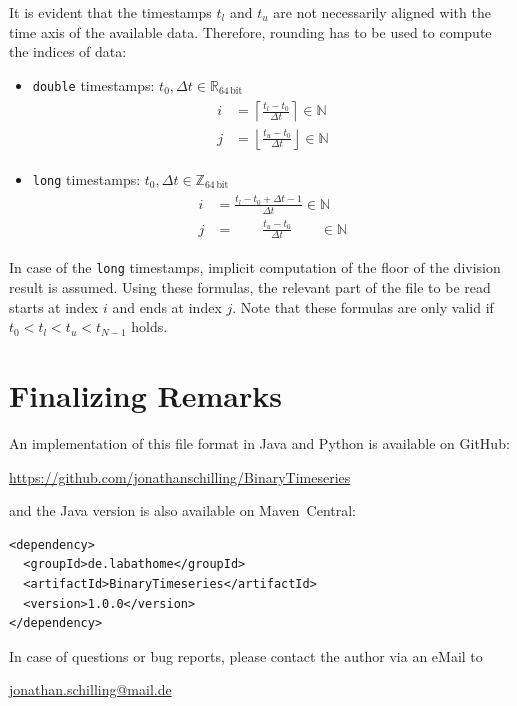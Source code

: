 \documentclass[a4paper,10pt]{article}
\begin{document}
It is evident that the timestamps $t_l$ and $t_u$ are not necessarily aligned with the time axis of the available data.
Therefore, rounding has to be used to compute the indices of data:
\begin{itemize}
  \item \texttt{double} timestamps: $t_0, \Delta t \in \mathbb{R}_\mathrm{64\,bit}$
  \begin{gather}
   \begin{aligned}
    i & = \left\lceil  \frac{t_l - t_0}{\Delta t} \right\rceil  \in \mathbb{N} \\
    j & = \left\lfloor \frac{t_u - t_0}{\Delta t} \right\rfloor \in \mathbb{N}
   \end{aligned}
  \end{gather}
  \item \texttt{long} timestamps: $t_0, \Delta t \in \mathbb{Z}_\mathrm{64\,bit}$
  \begin{gather}
   \begin{aligned}
    i & = \frac{t_l - t_0 + \Delta t - 1}{\Delta t} \in \mathbb{N} \\
    j & = \qquad \frac{t_u - t_0}{\Delta t} \qquad  \in \mathbb{N}
   \end{aligned}
  \end{gather}
\end{itemize}
In case of the \texttt{long} timestamps, implicit computation of the floor of the division result is assumed.
Using these formulas, the relevant part of the file to be read starts at index $i$ and ends at index $j$.
Note that these formulas are only valid if $t_0 < t_l < t_u < t_{N-1}$ holds.








\section{Finalizing Remarks}
An implementation of this file format in Java and Python is available on GitHub:
\begin{center}
\href{https://github.com/jonathanschilling/BinaryTimeseries}{https://github.com/jonathanschilling/BinaryTimeseries}
\end{center}
and the Java version is also available on Maven~Central:
\begin{verbatim}
<dependency>
  <groupId>de.labathome</groupId>
  <artifactId>BinaryTimeseries</artifactId>
  <version>1.0.0</version>
</dependency>
\end{verbatim}
In case of questions or bug reports, please contact the author via an eMail to
\begin{center}
\href{mailto:jonathan.schilling@mail.de}{jonathan.schilling@mail.de}
\end{center}
\end{document}
